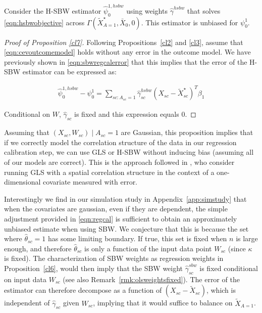 \begin{proposition}\label{cl7}
    Consider the H-SBW estimator $\hat{\psi}_0^{1, hsbw}$ using weights $\hat{\gamma}^{hsbw}$ that solves \eqref{eqn:hsbwobjective} across $\Gamma(\tilde{X}^\star_{A=1}, \bar{X}_0, 0)$. This estimator is unbiased for $\psi_0^1$.
\end{proposition}

\begin{proof}[Proof of Proposition \ref{cl7}]
    Following Propositions~\ref{cl2} and \ref{cl3}, assume that \eqref{eqn:cevoutcomemodel} holds without any error in the outcome model. We have previously shown in \eqref{eqn:sbwregcalerror} that this implies that the error of the H-SBW estimator can be expressed as:
    
    \begin{align*}
        \hat{\psi}^{1, hsbw}_0 - \psi^1_0 = \sum_{sc: A_{sc} = 1}\hat{\gamma}^{hsbw}_{sc}(X_{sc} - \tilde{X}_{sc}^\star)^T\beta_1
    \end{align*}
    
    Conditional on $W$, $\hat{\gamma}_{sc}$ is fixed and this expression equals 0. 
\end{proof}

\begin{remark}
    Assuming that $(X_{sc}, W_{sc}) \mid A_{sc} = 1$ are Gaussian, this proposition implies that if we correctly model the correlation structure of the data in our regression calibration step, we can use GLS or H-SBW without inducing bias (assuming all of our models are correct). This is the approach followed in \cite{huque2014impact}, who consider running GLS with a spatial correlation structure in the context of a one-dimensional covariate measured with error. 
\end{remark}

\begin{remark}
        Interestingly we find in our simulation study in Appendix~\ref{app:simstudy} that when the covariates are gaussian, even if they are dependent, the simple adjustment provided in \eqref{eqn:regcal} is sufficient to obtain an approximately unbiased estimate when using SBW. We conjecture that this is because the set where $\hat{\theta}_{sc} = 1$ has some limiting boundary. If true, this set is fixed when $n$ is large enough, and therefore $\hat{\theta}_{sc}$ is only a function of the input data point $W_{sc}$ (since $\kappa$ is fixed). The characterization of SBW weights as regression weights in Proposition~\ref{cl6}, would then imply that the SBW weight $\hat{\gamma}_{sc}^{sbw}$ is fixed conditional on input data $W_{sc}$ (see also Remark~\ref{rmk:olsweightsfixed}). The error of the estimator can therefore decompose as a function of $(X_{sc} - \tilde{X}_{sc})$, which is independent of $\hat{\gamma}_{sc}$ given $W_{sc}$, implying that it would suffice to balance on $\tilde{X}_{A=1}$.
\end{remark}



